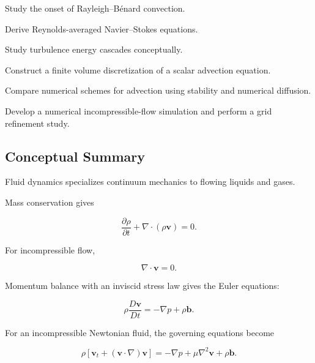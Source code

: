 \begin{exercise}[4]
Study the onset of Rayleigh--Bénard convection.
\end{exercise}

\begin{exercise}[4]
Derive Reynolds-averaged Navier--Stokes equations.
\end{exercise}

\begin{exercise}[4]
Study turbulence energy cascades conceptually.
\end{exercise}

\begin{exercise}[4]
Construct a finite volume discretization of a scalar advection equation.
\end{exercise}

\begin{exercise}[4]
Compare numerical schemes for advection using stability and numerical
diffusion.
\end{exercise}

\begin{exercise}[4]
Develop a numerical incompressible-flow simulation and perform a grid
refinement study.
\end{exercise}

\subsection{Conceptual Summary}
\label{subsec:fluid-dynamics-summary}

Fluid dynamics specializes continuum mechanics to flowing liquids and gases.

Mass conservation gives

\[
\boxed{
\frac{\partial\rho}{\partial t}
+
\nabla\cdot(\rho\mathbf{v})
=
0.
}
\]

For incompressible flow,

\[
\boxed{
\nabla\cdot\mathbf{v}=0.
}
\]

Momentum balance with an inviscid stress law gives the Euler equations:

\[
\boxed{
\rho
\frac{D\mathbf{v}}{Dt}
=
-\nabla p
+
\rho\mathbf{b}.
}
\]

For an incompressible Newtonian fluid, the governing equations become

\[
\boxed{
\rho
\left[
\mathbf{v}_t
+
(\mathbf{v}\cdot\nabla)\mathbf{v}
\right]
=
-\nabla p
+
\mu\nabla^2\mathbf{v}
+
\rho\mathbf{b}.
}
\]

